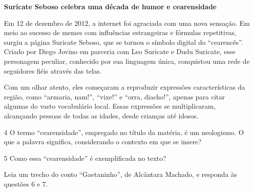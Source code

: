 \begin{myquote}
\begin{center}
\textbf{Suricate Seboso celebra uma década de humor e cearensidade}\\
\end{center}

\medskip

\noindent Em 12 de dezembro de 2012, a internet foi agraciada com uma nova
sensação. Em meio ao sucesso de memes com influências estrangeiras e
fórmulas repetitivas, surgiu a página Suricate Seboso, que se tornou o
símbolo digital do ``cearencês''. Criado por Diego Jovino em parceria
com Leo Suricate e Dudu Suricate, esse personagem peculiar, conhecido
por sua linguagem única, conquistou uma rede de seguidores fiéis através
das telas.

Com um olhar atento, eles começaram a reproduzir expressões
características da região, como ``armaria, nam!'', ``vixe!'' e ``orra,
diacho!'', apenas para citar algumas do vasto vocabulário local. Essas
expressões se multiplicaram, alcançando pessoas de todas as idades,
desde crianças até idosos.

\end{myquote}

\num{4} O termo ``cearensidade'', empregado no título da matéria, é um
neologismo. O que a palavra significa, considerando o contexto em que se
insere?


\num{5} Como essa ``cearensidade'' é exemplificada no texto?


Leia um trecho do conto ``Gaetaninho'', de Alcântara Machado, e responda
às questões 6 e 7.

